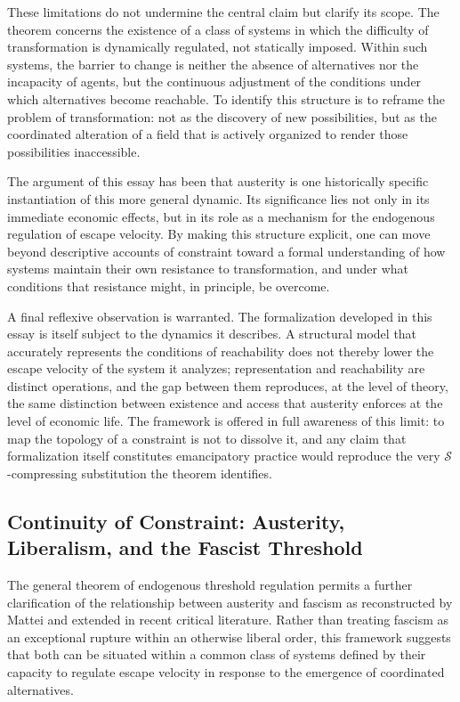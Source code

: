 \documentclass[11pt, a4paper]{article}
\begin{document}
These limitations do not undermine the central claim but clarify its scope. The theorem concerns the existence of a class of systems in which the difficulty of transformation is dynamically regulated, not statically imposed. Within such systems, the barrier to change is neither the absence of alternatives nor the incapacity of agents, but the continuous adjustment of the conditions under which alternatives become reachable. To identify this structure is to reframe the problem of transformation: not as the discovery of new possibilities, but as the coordinated alteration of a field that is actively organized to render those possibilities inaccessible.

The argument of this essay has been that austerity is one historically specific instantiation of this more general dynamic. Its significance lies not only in its immediate economic effects, but in its role as a mechanism for the endogenous regulation of escape velocity. By making this structure explicit, one can move beyond descriptive accounts of constraint toward a formal understanding of how systems maintain their own resistance to transformation, and under what conditions that resistance might, in principle, be overcome.

A final reflexive observation is warranted. The formalization developed in this essay is itself subject to the dynamics it describes. A structural model that accurately represents the conditions of reachability does not thereby lower the escape velocity of the system it analyzes; representation and reachability are distinct operations, and the gap between them reproduces, at the level of theory, the same distinction between existence and access that austerity enforces at the level of economic life. The framework is offered in full awareness of this limit: to map the topology of a constraint is not to dissolve it, and any claim that formalization itself constitutes emancipatory practice would reproduce the very $\mathcal{S}$-compressing substitution the theorem identifies.


\subsection{Continuity of Constraint: Austerity, Liberalism, and the Fascist Threshold}

The general theorem of endogenous threshold regulation permits a further clarification of the relationship between austerity and fascism as reconstructed by Mattei and extended in recent critical literature. Rather than treating fascism as an exceptional rupture within an otherwise liberal order, this framework suggests that both can be situated within a common class of systems defined by their capacity to regulate escape velocity in response to the emergence of coordinated alternatives.
\end{document}
